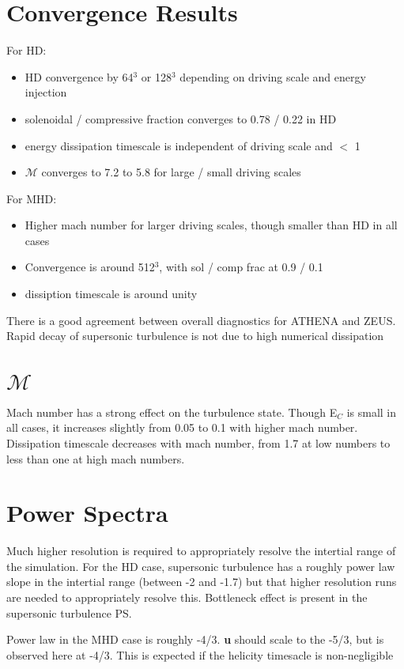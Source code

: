 \documentclass[a4paper]{article}
\begin{document}
\section{Convergence Results}
For HD:
\begin{itemize}
\item HD convergence by 64$^{3}$ or 128$^{3}$ depending on driving scale and
energy injection
\item solenoidal / compressive fraction converges to 0.78 / 0.22 in HD
\item energy dissipation timescale is independent of driving scale and $<$ 1
\item $\mathcal{M}$ converges to 7.2 to 5.8 for large / small driving scales
\end{itemize}

For MHD:
\begin{itemize}
\item Higher mach number for larger driving scales, though smaller than HD in
all cases
\item Convergence is around 512$^{3}$, with sol / comp frac at 0.9 / 0.1
\item dissiption timescale is around unity
\end{itemize}

There is a good agreement between overall diagnostics for ATHENA and ZEUS. 
Rapid decay of supersonic turbulence is not due to high numerical dissipation

\section{$\mathcal{M}$}
Mach number has a strong effect on the turbulence state. Though E$_C$ is small
in all cases, it increases slightly from 0.05 to 0.1 with higher mach number.
Dissipation timescale decreases with mach number, from 1.7 at low numbers to
less than one at high mach numbers.

\section{Power Spectra}
Much higher resolution is required to appropriately resolve the intertial 
range of the simulation. For the HD case, supersonic turbulence has a roughly
power law slope in the intertial range (between -2 and -1.7) but that higher
resolution runs are needed to appropriately resolve this. Bottleneck effect
is present in the supersonic turbulence PS.

Power law in the MHD case is roughly -4/3. \textbf{u} should scale to the 
-5/3, but is observed here at -4/3. This is expected if the helicity
timesacle is non-negligible
\end{document}
